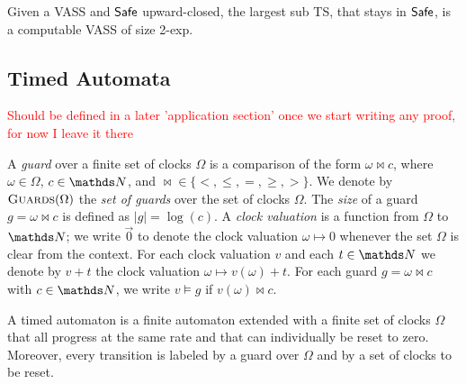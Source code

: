 \begin{theorem}{}
Given a VASS and $\textsf{Safe}$ upward-closed, the largest sub TS, that  stays in $\textsf{Safe}$, is a computable VASS of size 2-exp.
\end{theorem}

%
\iffalse
%
\subsection{Timed Automata}

\textcolor{red}{Should be defined in a later 'application section' once we start writing any proof, for now I leave it there} 

\renewcommand{\A}{\mathcal{A}}
\newcommand{\B}{\mathcal{B}}
\renewcommand{\C}{\mathcal{C}}
\newcommand{\Const}{\mathsf{Consts}}
\newcommand{\Conf}{\mathsf{Conf}}
\newcommand{\guards}{{\textsc{Guards}}}


A {\em guard} over a finite set of clocks $\Omega$ 
is a comparison of the form
$\omega \bowtie c$, where $ \omega \in \Omega$, $c \in \N$,
and $\bowtie\in\{<,\leq,=,\geq,>\}$.
%
We denote by $\guards(\Omega)$ the {\em set of guards} over the set of 
clocks $\Omega$.
The {\em size} %
 of a guard 
$g=\omega \bowtie c$ is defined as %
$|g|=\log(c)$.
A {\em clock valuation} is a function from $\Omega$ to $\N$;
we write $\vec{0}$ to denote the clock valuation $\omega \mapsto 0$
whenever the set $\Omega$ is clear from the context.
For each clock valuation $v$ and each $t\in\N$ we denote
by $v+t$ the clock valuation $\omega \mapsto v(\omega)+t$.
%
For each guard $g=\omega \bowtie c$ with $c\in\N$,
we write $v\models g$ if $v(\omega)\bowtie c$.

\iffalse
We define an {\em empty guard} $g_\epsilon$ over a non-empty finite set of clocks
$\Omega$ and to be of the form $\omega \geq 0$ for some 
$\omega \in \Omega$. In particular, we
defined $g_\epsilon$ such that for all $v \in \N^\Omega$ 
we have
$v \models g_\epsilon$, hence $g_\epsilon$ can be used as a guard that is always true. 
\fi



A timed automaton is a finite automaton extended with a finite set of clocks $\Omega$ that all progress at the same rate and that can individually be reset to zero. Moreover, every transition is labeled by a guard over 
$\Omega$  and by a set of clocks to be reset. \\

